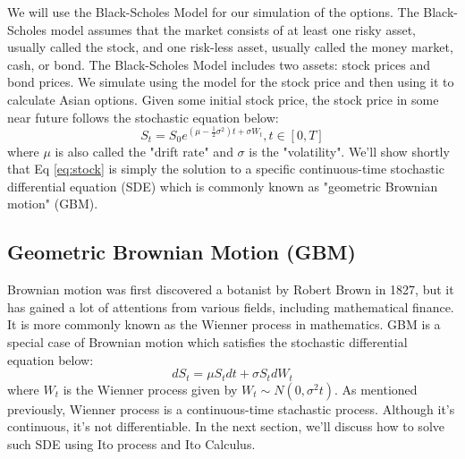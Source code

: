 \documentclass[%
 reprint,
 amsmath,amssymb,
 aps,
 nofootinbib,
 showpacs
]{revtex4-1}
\begin{document}
We will use the Black-Scholes Model for our simulation of the options.
The Black-Scholes model assumes that the market consists of at least one risky asset, usually called the stock, and one risk-less asset, usually called the money market, cash, or bond.
The Black-Scholes Model includes \cite{imf} two assets: stock prices and bond prices. We simulate using the model for the stock price and then using it to calculate Asian options.
Given some initial stock price, the stock price in some near future follows the stochastic equation below:
\begin{equation}\label{eq:stock}
S_t  = S_0 e ^ {(\mu - \frac{1}{2}\sigma^2)t+\sigma W_t},t\in [0,T]
\end{equation}
where $\mu$ is also called the "drift rate" and $\sigma$ is the "volatility".
We'll show shortly that Eq \ref{eq:stock} is simply the solution to a specific continuous-time stochastic differential equation (SDE) which is commonly known as "geometric Brownian motion" (GBM).

\subsection{Geometric Brownian Motion (GBM)}

Brownian motion was first discovered a botanist by Robert Brown in 1827, but it has gained a lot of attentions from various fields, including mathematical finance. It is more commonly known as the Wienner process in mathematics.
GBM is a special case of Brownian motion which satisfies the stochastic differential equation below:
\begin{equation} \label{eq:sde}
dS_t = \mu S_t dt + \sigma S_t dW_t
\end{equation}
where $W_t$ is the Wienner process given by $W_t \sim N(0,\sigma^2t)$.
As mentioned previously, Wienner process is a continuous-time stachastic process.
Although it's continuous, it's not differentiable. In the next section, we'll discuss how to solve such SDE using Ito process and Ito Calculus.
\end{document}

